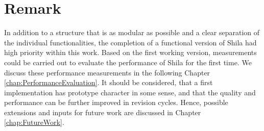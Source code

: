 \section{Remark}

In addition to a structure that is as modular as possible and a clear separation of the individual functionalities, the completion of a functional version of Shila had high priority within this work. Based on the first working version, measurements could be carried out to evaluate the performance of Shila for the first time. We discuss these performance measurements in the following Chapter \ref{chap:PerformanceEvaluation}. It should be considered, that a first implementation has prototype character in some sense, and that the quality and performance can be further improved in revision cycles. Hence, possible extensions and inputs for future work are discussed in Chapter \ref{chap:FutureWork}.